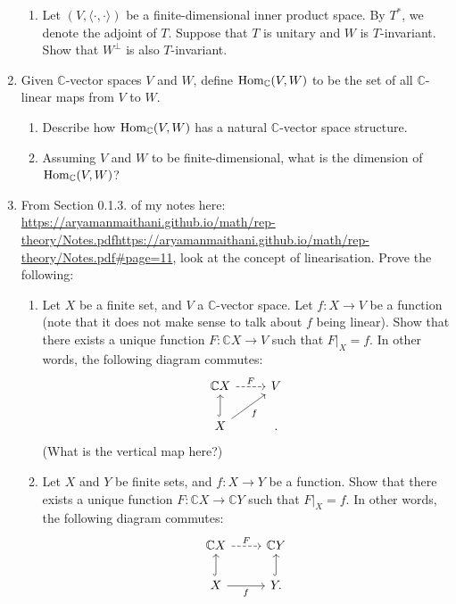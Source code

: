 \documentclass[12pt]{article}
\begin{document}
\begin{enumerate}
\begin{enumerate}
		\item Let $(V, \langle \cdot, \cdot\rangle)$ be a finite-dimensional inner product space. By $T^{\ast}$, we denote the adjoint of $T$. Suppose that $T$ is unitary and $W$ is $T$-invariant. Show that $W^{\perp}$ is also $T$-invariant.
	\end{enumerate}
	\item Given $\mathbb{C}$-vector spaces $V$ and $W$, define $\operatorname{Hom}_{\mathbb{C}}(V, W)$ to be the set of all $\mathbb{C}$-linear maps from $V$ to $W$.
	\begin{enumerate}
		\item Describe how $\operatorname{Hom}_{\mathbb{C}}(V, W)$ has a natural $\mathbb{C}$-vector space structure.
		\item Assuming $V$ and $W$ to be finite-dimensional, what is the dimension of $\operatorname{Hom}_{\mathbb{C}}(V, W)$?
	\end{enumerate}
	\item From Section 0.1.3. of my notes here: \url{https://aryamanmaithani.github.io/math/rep-theory/Notes.pdfhttps://aryamanmaithani.github.io/math/rep-theory/Notes.pdf#page=11}, look at the concept of linearisation. Prove the following:
	\begin{enumerate}
		\item Let $X$ be a finite set, and $V$ a $\mathbb{C}$-vector space. Let $f : X \to V$ be a function (note that it does not make sense to talk about $f$ being linear). Show that there exists a unique function $F : \mathbb{C}X \to V$ such that $F|_{X} = f$. In other words, the following diagram commutes:
		\begin{equation*} 
			\begin{tikzcd}
				\mathbb{C}X \arrow[r, "F", dashed] & V \\
				X \arrow[u, hook] \arrow[ru, "f"'] & .
			\end{tikzcd}
		\end{equation*}
		(What is the vertical map here?)
		\item Let $X$ and $Y$ be finite sets, and $f : X \to Y$ be a function. Show that there exists a unique function $F : \mathbb{C}X \to \mathbb{C}Y$ such that $F|_{X} = f$. In other words, the following diagram commutes:
		\begin{equation*} 
			\begin{tikzcd}
				\mathbb{C}X \arrow[r, "F", dashed] & \mathbb{C}Y \\
				X \arrow[u, hook] \arrow[r, "f"'] & Y \arrow[u, hook].
			\end{tikzcd}

\end{equation*}
\end{enumerate}
\end{enumerate}
\end{document}
